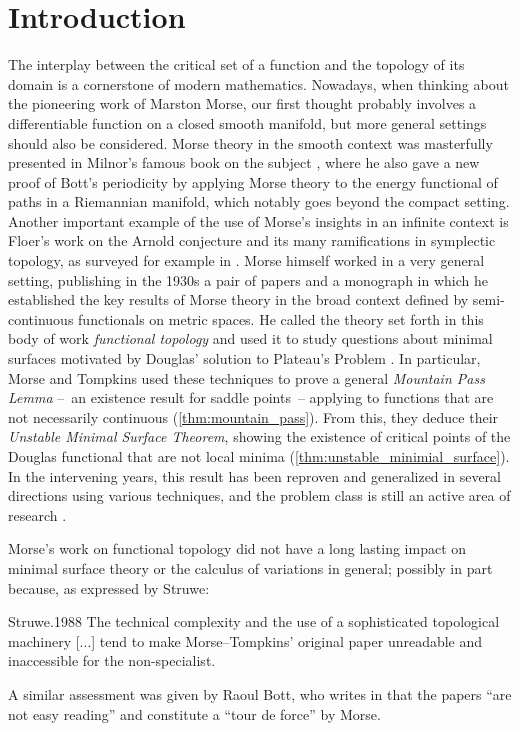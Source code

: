 
\section{Introduction}

The interplay between the critical set of a function and the topology of its domain is a cornerstone of modern mathematics.
Nowadays, when thinking about the pioneering work of Marston Morse, our first thought probably involves a differentiable function on a closed smooth manifold, but more general settings should also be considered.
Morse theory in the smooth context was masterfully presented in Milnor's famous book on the subject \cite{Milnor.1963}, where he also gave a new proof of Bott's periodicity by applying Morse theory to the energy functional of paths in a Riemannian manifold, which notably goes beyond the compact setting.
Another important example of the use of Morse's insights in an infinite context is Floer's work on the Arnold conjecture and its many ramifications in symplectic topology, as surveyed for example in \cite{Salamon.1999}.
Morse himself worked in a very general setting, publishing in the 1930s a pair of papers \cite{Morse.1937, Morse.1940} and a monograph \cite{Morse.1938} in which he established the key results of Morse theory in the broad context defined by semi-continuous functionals on metric spaces.
He called the theory set forth in this body of work \emph{functional topology} and used it to study questions about minimal surfaces motivated by Douglas' solution to Plateau’s Problem \cite{Douglas.1931}.
In particular, Morse and Tompkins \cite{Morse.1939} used these techniques to prove a general \emph{Mountain Pass Lemma} --~an existence result for saddle points~-- applying to functions that are not necessarily continuous (\cref{thm:mountain_pass}).
From this, they deduce their \emph{Unstable Minimal Surface Theorem}, showing the existence of critical points of the Douglas functional that are not local minima (\cref{thm:unstable_minimial_surface}).
In the intervening years, this result has been reproven and generalized in several directions using various techniques, and the problem class is still an active area of research \cite{Struwe.1984,Jost.1990,Jost.1991,Montezuma.2020,Marques.2021}.

Morse's work on functional topology did not have a long lasting impact on minimal surface theory or the calculus of variations in general; possibly in part because, as expressed by Struwe:
\begin{displaycquote}[p.~82]{Struwe.1988}
	The technical complexity and the use of a sophisticated topological machinery [...] tend to make Morse--Tompkins' original paper unreadable and inaccessible for the non-specialist.
\end{displaycquote}
A similar assessment was given by Raoul Bott, who writes in \cite[p.~934]{Bott.1980} that the papers \cite{Morse.1937, Morse.1940} ``are not easy reading'' and constitute a ``tour de force'' by Morse.

